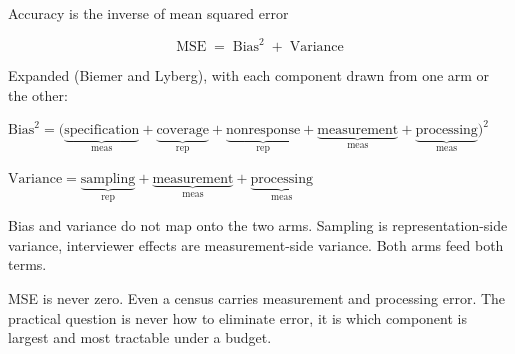 \documentclass[
  ignorenonframetext,
  aspectratio=169,
]{beamer}
\newcommand{\kicker}[1]{\par\noindent{\footnotesize\color{vteal}\textbf{\MakeUppercase{#1}}}\par\vspace{0.4em}}
\begin{document}
\begin{frame}[shrink]{Accuracy is the inverse of mean squared error}
\label{accuracy-is-the-inverse-of-mean-squared-error}
\kicker{the core of the framework}

\small

\[\text{MSE} \;=\; \text{Bias}^2 \;+\; \text{Variance}\]

\footnotesize
\vspace{0.2em}

Expanded (Biemer and Lyberg), with each component drawn from one arm or
the other:

\vspace{0.4em}

\(\text{Bias}^2 = \big(\underbrace{\text{specification}}_{\text{meas}} + \underbrace{\text{coverage}}_{\text{rep}} + \underbrace{\text{nonresponse}}_{\text{rep}} + \underbrace{\text{measurement}}_{\text{meas}} + \underbrace{\text{processing}}_{\text{meas}}\big)^2\)

\vspace{0.5em}

\(\text{Variance} = \underbrace{\text{sampling}}_{\text{rep}} + \underbrace{\text{measurement}}_{\text{meas}} + \underbrace{\text{processing}}_{\text{meas}}\)

\vspace{0.6em}

\begin{center}
\colorbox{vteal!15}{\parbox{0.9\textwidth}{\centering\footnotesize
Bias and variance do not map onto the two arms. Sampling is representation-side variance, interviewer effects are measurement-side variance. Both arms feed both terms.}}
\end{center}

\vspace{0.3em}
\footnotesize

MSE is never zero. Even a census carries measurement and processing
error. The practical question is never how to eliminate error, it is
which component is largest and most tractable under a budget.

\end{frame}
\end{document}

